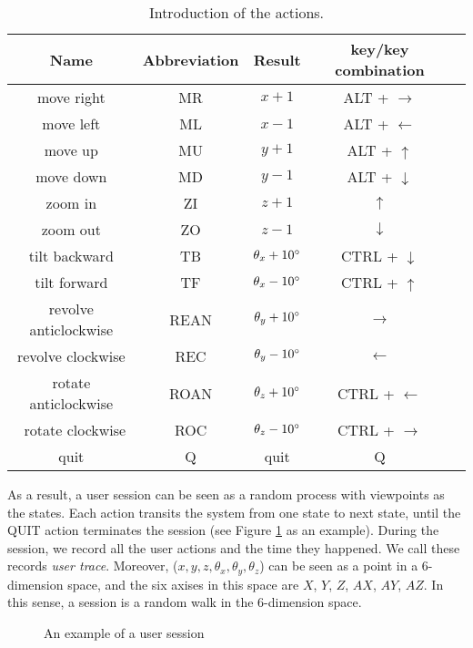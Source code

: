 \begin{table}
    \centering
    \begin{tabular}{|c|c|c|c|c|}
        \hline
        Name & Abbreviation & Result & key/key combination \\
        \hline
        move right & MR     & $x + 1$  & ALT + $\rightarrow$\\
        move left  & ML     & $x - 1$  & ALT + $\leftarrow$\\
        move up    & MU     & $y + 1$  & ALT + $\uparrow$\\
        move down  & MD     & $y - 1$  & ALT + $\downarrow$\\
        zoom in    & ZI     & $z + 1$  & $\uparrow$\\
        zoom out   & ZO     & $z - 1$  & $\downarrow$\\
        tilt backward & TB  & $\theta_x + 10^\circ$ & CTRL + $\downarrow$\\
        tilt forward & TF   & $\theta_x - 10^\circ$ & CTRL + $\uparrow$\\
        revolve anticlockwise & REAN & $\theta_y + 10^\circ$ & $\rightarrow$\\
        revolve clockwise & REC & $\theta_y - 10^\circ$ & $\leftarrow$\\
        rotate  anticlockwise & ROAN & $\theta_z + 10^\circ$ & CTRL + $\leftarrow$\\\
        rotate  clockwise & ROC &  $\theta_z - 10^\circ$ & CTRL + $\rightarrow$\\
        quit       & Q      & quit     & Q \\
        \hline
    \end{tabular}
    \caption{Introduction of the actions.}\label{t:user:action}
\end{table}


As a result, a user session can be seen as a random process 
with viewpoints as the states. Each action transits
the system from one state to next state, until the QUIT
action terminates the session (see Figure \ref{f:user:transition} as an example). 
During the session, we record
all the user actions and the time they happened.  We call these 
records \textit{user trace}.
Moreover, ($x, y, z, \theta_x, \theta_y, \theta_z$) can be seen as a point in a 6-dimension space, and
the six axises in this space are $X$, $Y$, $Z$, $AX$, $AY$, $AZ$. 
In this sense, a session is a random walk in the 6-dimension space.
\begin{figure}
    \centering
    \caption{An example of a user session}
    \label{f:user:transition}
\end{figure}


